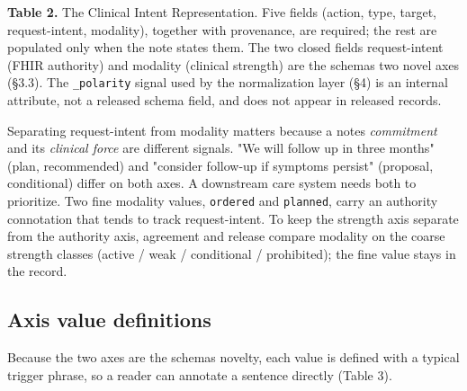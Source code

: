 \textbf{Table 2.} The Clinical Intent Representation. Five fields (action, type, target, request-intent, modality), together with provenance, are required; the rest are populated only when the note states them. The two closed fields request-intent (FHIR authority) and modality (clinical strength) are the schema\textquotesingle s two novel axes (§3.3). The \texttt{\_polarity} signal used by the normalization layer (§4) is an internal attribute, not a released schema field, and does not appear in released records.

Separating request-intent from modality matters because a note\textquotesingle s \emph{commitment} and its \emph{clinical force} are different signals. "We will follow up in three months" (plan, recommended) and "consider follow-up if symptoms persist" (proposal, conditional) differ on both axes. A downstream care system needs both to prioritize. Two fine modality values, \texttt{ordered} and \texttt{planned}, carry an authority connotation that tends to track request-intent. To keep the strength axis separate from the authority axis, agreement and release compare modality on the coarse strength classes (active / weak / conditional / prohibited); the fine value stays in the record.

\subsection{Axis value definitions}\label{axis-value-definitions}

Because the two axes are the schema\textquotesingle s novelty, each value is defined with a typical trigger phrase, so a reader can annotate a sentence directly (Table 3).

